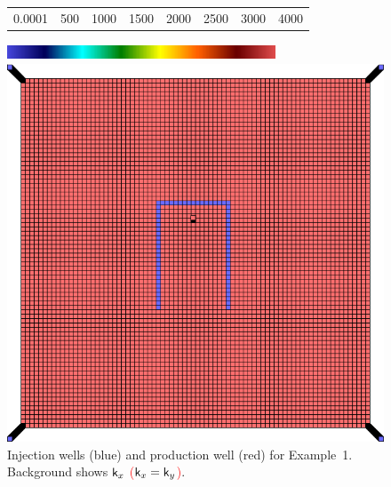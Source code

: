 \documentclass[twocolumn,numbook]{svjour3}          %
\newcommand{\red}[1]{\textcolor{red}{#1}}
\begin{document}
\begin{figure}[ht]
\begin{center}
     \begin{tabular}{cccccccc}
      0.0001 &  500 & 1000 & 1500 & 2000 & 2500 & 3000 &4000
      \end{tabular}
      \includegraphics[width=8cm, height=0.5cm]{VanEssenModelPermeabilityMapColorBar.png}
       
       \medskip

       \includegraphics[totalheight=3.in]{PiPermeabilityMapAndWells.png} 
       \end{center}
     \caption{Injection wells (blue) and production well (red) for Example~1. Background shows \red{$\mathsf{k}_x$ ($ \mathsf{k}_x = \mathsf{k}_y$)}.}
  \label{fig:PImodelPermeabilityMapAndWells}
\end{figure}
\end{document}
